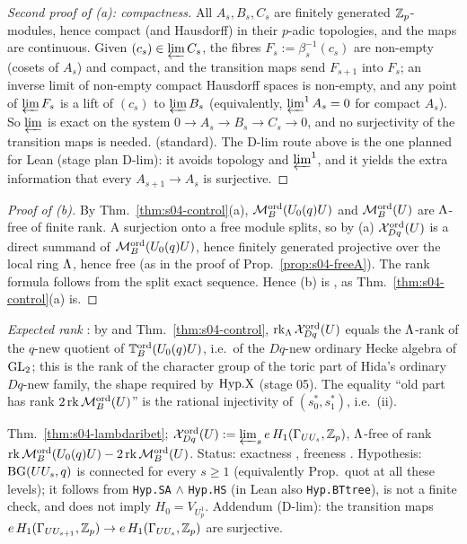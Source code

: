 \begin{proof}[Second proof of (a): compactness]
All $A_s,B_s,C_s$ are finitely generated $\mathbb{Z}_p$-modules, hence compact (and Hausdorff) in their $p$-adic topologies, and the maps
are continuous. Given $(c_s)\in\varprojlim C_s$, the fibres $F_s:=\beta_s^{-1}(c_s)$ are non-empty (cosets of $A_s$) and compact,
and the transition maps send $F_{s+1}$ into $F_s$; an inverse limit of non-empty compact Hausdorff spaces is non-empty, and any point of
$\varprojlim F_s$ is a lift of $(c_s)$ to $\varprojlim B_s$ (equivalently, $\varprojlim^1A_s=0$ for compact $A_s$). So $\varprojlim$ is exact on the system $0\to A_s\to B_s\to C_s\to0$, and no surjectivity of the
transition maps is needed. \stproved{} (standard). The D-lim route above is the one planned for Lean (stage plan D-lim): it avoids
topology and $\varprojlim^1$, and it yields the extra information that every $A_{s+1}\to A_s$ is surjective.
\end{proof}

\begin{proof}[Proof of (b)]
By Thm.~\ref{thm:s04-control}(a), $\mathcal{M}^{\mathrm{ord}}_B(U_0(q)U)$ and $\mathcal{M}^{\mathrm{ord}}_B(U)$ are $\Lambda$-free of finite rank. A surjection onto a free module
splits, so by (a) $\mathcal{X}^{\mathrm{ord}}_{Dq}(U)$ is a direct summand of $\mathcal{M}^{\mathrm{ord}}_B(U_0(q)U)$, hence finitely generated projective over the local ring
$\Lambda$, hence free (as in the proof of Prop.~\ref{prop:s04-freeA}). The rank formula follows from the split exact sequence. Hence (b)
is \stproved{}, as Thm.~\ref{thm:s04-control}(a) is.
\end{proof}

\noindent\emph{Expected rank} \stexp: by  and Thm.~\ref{thm:s04-control}, $\operatorname{rk}_\Lambda\mathcal{X}^{\mathrm{ord}}_{Dq}(U)$ equals the
$\Lambda$-rank of the $q$-new quotient of $\mathbb{T}^{\mathrm{ord}}_B(U_0(q)U)$, i.e.\ of the $Dq$-new ordinary Hecke algebra of $\mathrm{GL}_2$; this is the
rank of the character group of the toric part of Hida's ordinary $Dq$-new family, the shape required by $\mathrm{Hyp.X}$ (stage 05). The
equality ``old part has rank $2\operatorname{rk}\mathcal{M}^{\mathrm{ord}}_B(U)$'' is the rational injectivity of $(s_0^*,s_1^*)$, i.e.\ (ii).

\begin{interface}\label{if:s04-lambdaribet}
Thm.~\ref{thm:s04-lambdaribet}; $\mathcal{X}^{\mathrm{ord}}_{Dq}(U):=\varprojlim_se\,H_1(\Gamma_{UU_s},\mathbb{Z}_p)$, $\Lambda$-free of rank
$\operatorname{rk}\mathcal{M}^{\mathrm{ord}}_B(U_0(q)U)-2\operatorname{rk}\mathcal{M}^{\mathrm{ord}}_B(U)$. Status: exactness \stproved, freeness \stproved. Hypothesis: $\mathrm{BG}(UU_s,q)$ is connected for every
$s\ge1$ (equivalently Prop.~quot at all these levels); it follows from \texttt{Hyp.SA} $\wedge$ \texttt{Hyp.HS} (in Lean also \texttt{Hyp.BTtree}), is not a finite check,
and does not imply $H_0=V_{U_p^1}$. Addendum (D-lim): the transition maps $e\,H_1(\Gamma_{UU_{s+1}},\mathbb{Z}_p)\to e\,H_1(\Gamma_{UU_s},\mathbb{Z}_p)$
are surjective.
\end{interface}

